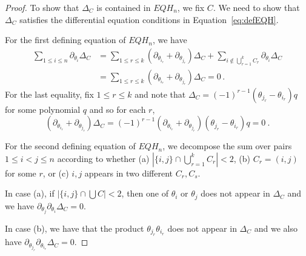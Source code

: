 \documentclass[11pt,oneside]{amsart}
\theoremstyle{definition}
\numberwithin{equation}{section}
\begin{document}
\begin{proof}
To show that  $\Delta_C$ is  contained in $EQH_n $, we fix $C$. We need to show that $\Delta_C$ satisfies the differential equation conditions in Equation~\eqref{eq:defEQH}.

For the first  defining equation of $EQH_n$, we have
\begin{align*}
 \sum_{1\le i\le n} \partial_{\theta_i}\Delta_C&=\sum_{1\le r\le k}  (\partial_{\theta_{i_r}}+\partial_{\theta_{j_r}})\Delta_C + \sum_{i\notin \bigcup_{r=1}^k C_r}  \partial_{\theta_i}\Delta_C\\
 &=\sum_{1\le r\le k}  (\partial_{\theta_{i_r}}+\partial_{\theta_{j_r}})\Delta_C =0\,.
  \end{align*}
For the last equality, fix $1\le r\le k$ and note that
$\Delta_C =(-1)^{r-1}(\theta_{j_r}-\theta_{i_r}) q$ for some  polynomial $q$
and so for each $r$,
$$(\partial_{\theta_{i_r}}+\partial_{\theta_{j_r}})\Delta_C=(-1)^{r-1}
(\partial_{\theta_{i_r}}+\partial_{\theta_{j_r}})(\theta_{j_r}-\theta_{i_r})q =0~.
$$

For the second defining equation of $EQH_n $, we decompose the sum over pairs $1\le i<j\le n$ according to
whether (a) $|\{i,j\}\cap \bigcup_{r=1}^k C_r|<2$, (b) $C_r = (i,j)$ for some $r$, or
(c) $i,j$ appears in two different $C_{r},C_{s}$.

In case (a), if  $|\{i,j\}\cap \bigcup C|<2$, then one of $\theta_i$ or $\theta_j$ does not appear in $\Delta_C$ and we have $ \partial_{\theta_j} \partial_{\theta_i}\Delta_C=0$.

In case (b), we have that the product $\theta_{j_r}\theta_{i_r}$ does not appear in $\Delta_C$ and we also have $ \partial_{\theta_{j_r}} \partial_{\theta_{i_r}}\Delta_C=0$.


\end{proof}
\end{document}
